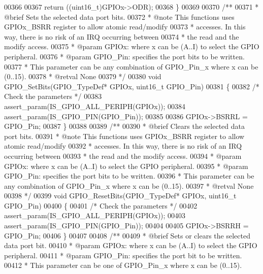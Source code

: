 \begin{DoxyCode}
00366 
00367   \textcolor{keywordflow}{return} ((uint16\_t)GPIOx->ODR);
00368 \}
00369 
00370 \textcolor{comment}{/**}
00371 \textcolor{comment}{  * @brief  Sets the selected data port bits.}
00372 \textcolor{comment}{  * @note   This functions uses GPIOx\_BSRR register to allow atomic read/modify }
00373 \textcolor{comment}{  *         accesses. In this way, there is no risk of an IRQ occurring between}
00374 \textcolor{comment}{  *         the read and the modify access.}
00375 \textcolor{comment}{  * @param  GPIOx: where x can be (A..I) to select the GPIO peripheral.}
00376 \textcolor{comment}{  * @param  GPIO\_Pin: specifies the port bits to be written.}
00377 \textcolor{comment}{  *          This parameter can be any combination of GPIO\_Pin\_x where x can be (0..15).}
00378 \textcolor{comment}{  * @retval None}
00379 \textcolor{comment}{  */}
00380 \textcolor{keywordtype}{void} GPIO_SetBits(GPIO\_TypeDef* GPIOx, uint16\_t GPIO\_Pin)
00381 \{
00382   \textcolor{comment}{/* Check the parameters */}
00383   assert_param(IS\_GPIO\_ALL\_PERIPH(GPIOx));
00384   assert_param(IS\_GPIO\_PIN(GPIO\_Pin));
00385 
00386   GPIOx->BSRRL = GPIO\_Pin;
00387 \}
00388 
00389 \textcolor{comment}{/**}
00390 \textcolor{comment}{  * @brief  Clears the selected data port bits.}
00391 \textcolor{comment}{  * @note   This functions uses GPIOx\_BSRR register to allow atomic read/modify }
00392 \textcolor{comment}{  *         accesses. In this way, there is no risk of an IRQ occurring between}
00393 \textcolor{comment}{  *         the read and the modify access.}
00394 \textcolor{comment}{  * @param  GPIOx: where x can be (A..I) to select the GPIO peripheral.}
00395 \textcolor{comment}{  * @param  GPIO\_Pin: specifies the port bits to be written.}
00396 \textcolor{comment}{  *          This parameter can be any combination of GPIO\_Pin\_x where x can be (0..15).}
00397 \textcolor{comment}{  * @retval None}
00398 \textcolor{comment}{  */}
00399 \textcolor{keywordtype}{void} GPIO_ResetBits(GPIO\_TypeDef* GPIOx, uint16\_t GPIO\_Pin)
00400 \{
00401   \textcolor{comment}{/* Check the parameters */}
00402   assert_param(IS\_GPIO\_ALL\_PERIPH(GPIOx));
00403   assert_param(IS\_GPIO\_PIN(GPIO\_Pin));
00404 
00405   GPIOx->BSRRH = GPIO\_Pin;
00406 \}
00407 
00408 \textcolor{comment}{/**}
00409 \textcolor{comment}{  * @brief  Sets or clears the selected data port bit.}
00410 \textcolor{comment}{  * @param  GPIOx: where x can be (A..I) to select the GPIO peripheral.}
00411 \textcolor{comment}{  * @param  GPIO\_Pin: specifies the port bit to be written.}
00412 \textcolor{comment}{  *          This parameter can be one of GPIO\_Pin\_x where x can be (0..15).}

\end{DoxyCode}
